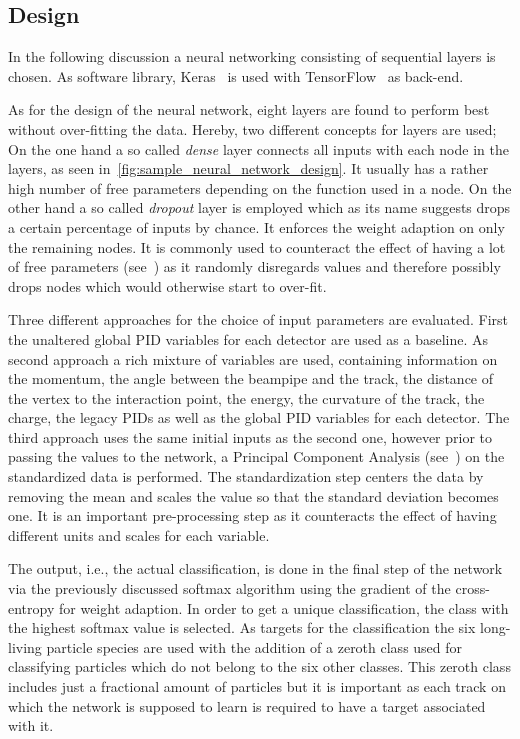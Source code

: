 \subsection{Design}
\label{subsec:neural_network_design}

In the following discussion a neural networking consisting of sequential layers is chosen. As software library, Keras~\cite{chollet2015keras} is used with TensorFlow~\cite{tensorflow2015-whitepaper} as back-end.

As for the design of the neural network, eight layers are found to perform best without over-fitting the data. Hereby, two different concepts for layers are used; On the one hand a so called \textit{dense} layer connects all inputs with each node in the layers, as seen in~\autoref{fig:sample_neural_network_design}. It usually has a rather high number of free parameters depending on the function used in a node. On the other hand a so called \textit{dropout} layer is employed which as its name suggests drops a certain percentage of inputs by chance. It enforces the weight adaption on only the remaining nodes. It is commonly used to counteract the effect of having a lot of free parameters (see~\cite{MachineLearning:DeepLearning}) as it randomly disregards values and therefore possibly drops nodes which would otherwise start to over-fit.

Three different approaches for the choice of input parameters are evaluated. First the unaltered global PID variables for each detector are used as a baseline. As second approach a rich mixture of variables are used, containing information on the momentum, the angle between the beampipe and the track, the distance of the vertex to the interaction point, the energy, the curvature of the track, the charge, the legacy PIDs as well as the global PID variables for each detector. The third approach uses the same initial inputs as the second one, however prior to passing the values to the network, a Principal Component Analysis (see~\cite{BigDataManagementAndAnalytics:TextProcessingAndHigh-DimensionalData}) on the standardized data is performed. The standardization step centers the data by removing the mean and scales the value so that the standard deviation becomes one. It is an important pre-processing step as it counteracts the effect of having different units and scales for each variable.

The output, i.e., the actual classification, is done in the final step of the network via the previously discussed softmax algorithm using the gradient of the cross-entropy for weight adaption. In order to get a unique classification, the class with the highest softmax value is selected. As targets for the classification the six long-living particle species are used with the addition of a zeroth class used for classifying particles which do not belong to the six other classes. This zeroth class includes just a fractional amount of particles but it is important as each track on which the network is supposed to learn is required to have a target associated with it.

